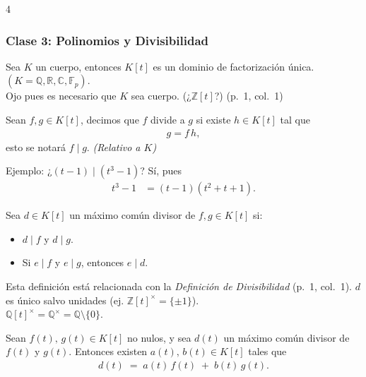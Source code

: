 \documentclass[landscape,a4paper]{article}
\begin{document}
\begin{multicols}{4}
\subsubsection*{Clase 3: Polinomios y Divisibilidad}
\noindent Sea $K$ un cuerpo, entonces $K[t]$ es un dominio de factorización única. $(K = \mathbb{Q}, \mathbb{R}, \mathbb{C}, \mathbb{F}_p)$.\\
Ojo pues es necesario que $K$ sea cuerpo. (¿$\mathbb{Z}[t]$?) (p.~1, col.~1)
\begin{tcolorbox}[colback=white,colframe=blue!80!black,colbacktitle=blue!80!black,coltitle=white,title=Definición: Divisibilidad]
Sean $f,g \in K[t]$, decimos que $f$ divide a $g$ si existe $h \in K[t]$ tal que
\begin{align*}
g = f\,h,
\end{align*}
esto se notará $f \mid g$. \textit{(Relativo a $K$)}
\end{tcolorbox}
\noindent Ejemplo: ¿$(t - 1)\mid (t^3 - 1)$? Sí, pues
\begin{align*}
t^3 - 1 &= (t - 1)(t^2 + t + 1).
\end{align*}
\begin{tcolorbox}[colback=white,colframe=blue!80!black,colbacktitle=blue!80!black,coltitle=white,title=Definición: Máximo Común Divisor]
Sea $d \in K[t]$ un máximo común divisor de $f,g \in K[t]$ si:
\begin{itemize}
  \item $d \mid f$ y $d \mid g$.
  \item Si $e \mid f$ y $e \mid g$, entonces $e \mid d$.
\end{itemize}
\end{tcolorbox}
\noindent Esta definición está relacionada con la \textit{Definición de Divisibilidad} (p.~1, col.~1).
\noindent $d$ es único salvo unidades (ej. $\mathbb{Z}[t]^\times = \{\pm1\}$).\\
$\mathbb{Q}[t]^\times = \mathbb{Q}^\times = \mathbb{Q}\setminus\{0\}$.
\begin{tcolorbox}[colback=white,colframe=red!80!black,colbacktitle=red!80!black,coltitle=white,title={Teorema: Identidad de Bézout (p.~1, col.~1)}]
Sean $f(t),\,g(t)\in K[t]$ no nulos, y sea $d(t)$ un máximo común divisor de $f(t)$ y $g(t)$. Entonces existen $a(t),\,b(t)\in K[t]$ tales que
\begin{align*}
  d(t) \;=\; a(t)\,f(t) \;+\; b(t)\,g(t).
\end{align*}
\end{tcolorbox}

\end{multicols}
\end{document}
